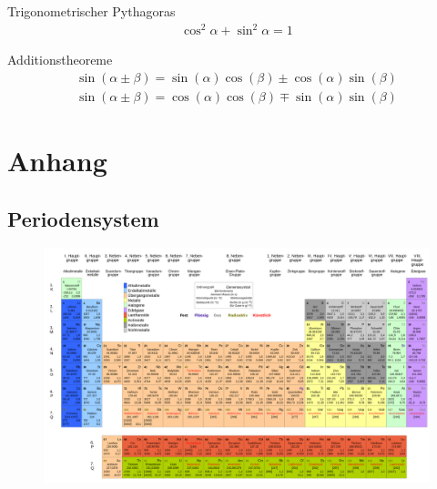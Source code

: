 \documentclass[17pt]{extarticle}
\begin{document}
	Trigonometrischer Pythagoras
	\begin{align}
		\cos^2 \alpha + \sin^2 \alpha = 1
	\end{align}

	Additionstheoreme
	\begin{align}
		\sin(\alpha \pm \beta) = \sin(\alpha) \cos(\beta) \pm \cos(\alpha) \sin(\beta)
	\end{align}
	\begin{align}
		\sin(\alpha \pm \beta) = \cos(\alpha) \cos(\beta) \mp \sin(\alpha) \sin(\beta)
	\end{align}

\section{Anhang}
	\subsection{Periodensystem}
	\begin{figure}[h!]
		\centering
		\includegraphics[width=25cm, angle=90]{img/Periodensystem.png}
	\end{figure}
\end{document}
